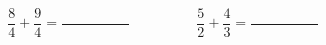
\question \[ \frac{8}{4} + \frac{9}{4} = \frac{\hspace{2cm}}{\hspace{2cm}} 
             \hspace{2cm}
             \frac{5}{2} + \frac{4}{3} = \frac{\hspace{2cm}}{\hspace{2cm}}
          \]

